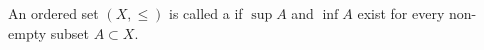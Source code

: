 An ordered set $(X, \leq)$ is called a  if $\sup A$ and $\inf A$ exist for every non-empty subset $A \subset X$.
